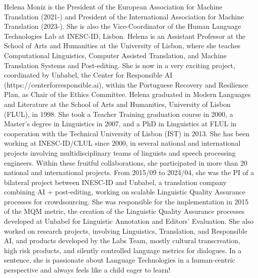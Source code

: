 Helena Moniz is the President of the European Association for Machine Translation (2021-) and President of the International Association for Machine Translation (2023-). She is also the Vice-Coordinator of the Human Language Technologies Lab at INESC-ID, Lisbon. Helena is an Assistant Professor at the School of Arts and Humanities at the University of Lisbon, where she teaches Computational Linguistics, Computer Assisted Translation, and Machine Translation Systems and Post-editing. She is now in a very exciting project, coordinated by Unbabel, the Center for Responsible AI (https://centerforresponsible.ai), within the Portuguese Recovery and Resilience Plan, as Chair of the Ethics Committee.
Helena graduated in Modern Languages and Literature at the School of Arts and Humanities, University of Lisbon (FLUL), in 1998. She took a Teacher Training graduation course in 2000, a Master’s degree in Linguistics in 2007, and a PhD in Linguistics at FLUL in cooperation with the Technical University of Lisbon (IST) in 2013. She has been working at INESC-ID/CLUL since 2000, in several national and international projects involving multidisciplinary teams of linguists and speech processing engineers. Within these fruitful collaborations, she participated in more than 20 national and international projects.
From 2015/09 to 2024/04, she was the PI of a bilateral project between INESC-ID and Unbabel, a translation company combining AI + post-editing, working on scalable Linguistic Quality Assurance processes for crowdsourcing. She was responsible for the implementation in 2015 of the MQM metric, the creation of the Linguistic Quality Assurance processes developed at Unbabel for Linguistic Annotation and Editors' Evaluation. She also worked on research projects, involving Linguistics, Translation, and Responsible AI, and products developed by the Labs Team, mostly cultural transcreation, high risk products, and silently controlled language metrics for dialogues.
In a sentence, she is passionate about Language Technologies in a human-centric perspective and always feels like a child eager to learn!
